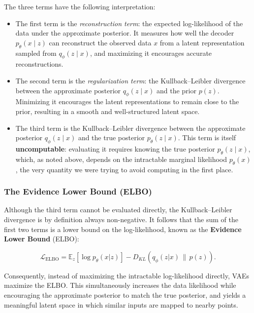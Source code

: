 The three terms have the following interpretation:

\begin{itemize}
    \item The first term is the \textit{reconstruction term}: the expected log-likelihood of the data under the approximate posterior. It measures how well the decoder $p_\theta(x \mid z)$ can reconstruct the observed data $x$ from a latent representation sampled from $q_\phi(z \mid x)$, and maximizing it encourages accurate reconstructions.

    \item The second term is the \textit{regularization term}: the Kullback--Leibler divergence between the approximate posterior $q_\phi(z \mid x)$ and the prior $p(z)$. Minimizing it encourages the latent representations to remain close to the prior, resulting in a smooth and well-structured latent space.

    \item The third term is the Kullback--Leibler divergence between the approximate posterior $q_\phi(z \mid x)$ and the true posterior $p_\theta(z \mid x)$. This term is itself \textbf{uncomputable}: evaluating it requires knowing the true posterior $p_\theta(z \mid x)$, which, as noted above, depends on the intractable marginal likelihood $p_\theta(x)$, the very quantity we were trying to avoid computing in the first place.
\end{itemize}

\subsubsection{The Evidence Lower Bound (ELBO)}

Although the third term cannot be evaluated directly, the Kullback--Leibler divergence is by definition always non-negative. It follows that the sum of the first two terms is a lower bound on the log-likelihood, known as the \textbf{Evidence Lower Bound} (ELBO):

\begin{equation}
    \label{eq:ELBO}
    \mathcal{L}_{\mathrm{ELBO}}
    =
    \mathbb{E}_{z}
    \left[
        \log p_\theta(x|z)
    \right]
    -
    D_{KL}
    \left(
        q_\phi(z|x)
        \,\|\,p(z)
    \right).
\end{equation}

Consequently, instead of maximizing the intractable log-likelihood directly, VAEs maximize the ELBO. This simultaneously increases the data likelihood while encouraging the approximate posterior to match the true posterior, and yields a meaningful latent space in which similar inputs are mapped to nearby points.

